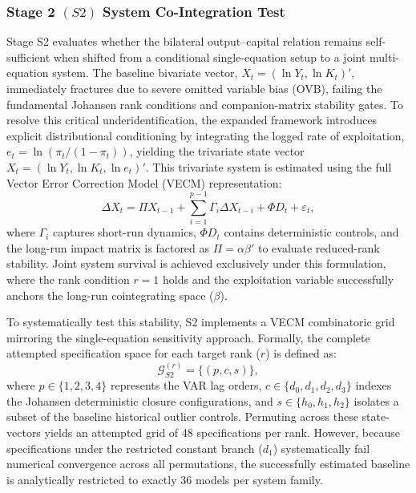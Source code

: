 \documentclass[11pt]{article}
\begin{document}
\subsubsection{Stage 2 \texorpdfstring{$(S2)$}: System Co-Integration Test}
\label{subsec:S2_system}

Stage S2 evaluates whether the bilateral output--capital relation remains self-sufficient when shifted from a conditional single-equation setup to a joint multi-equation system. The baseline bivariate vector, $X_t = (\ln Y_t, \ln K_t)'$, immediately fractures due to severe omitted variable bias (OVB), failing the fundamental Johansen rank conditions and companion-matrix stability gates. To resolve this critical underidentification, the expanded framework introduces explicit distributional conditioning by integrating the logged rate of exploitation, $e_t = \ln(\pi_t / (1 - \pi_t))$, yielding the trivariate state vector $X_t = (\ln Y_t, \ln K_t, \ln e_t)'$. This trivariate system is estimated using the full \citet{Johansen1991} Vector Error Correction Model (VECM) representation:
\begin{equation}
\label{eq:vecm_johansen}
\Delta X_t = \Pi X_{t-1} + \sum_{i=1}^{p-1} \Gamma_i \Delta X_{t-i} + \Phi D_t + \varepsilon_t,
\end{equation}
where $\Gamma_i$ captures short-run dynamics, $\Phi D_t$ contains deterministic controls, and the long-run impact matrix is factored as $\Pi = \alpha \beta'$ to evaluate reduced-rank stability. Joint system survival is achieved exclusively under this formulation, where the rank condition $r=1$ holds and the exploitation variable successfully anchors the long-run cointegrating space ($\beta$).

To systematically test this stability, S2 implements a VECM combinatoric grid mirroring the single-equation sensitivity approach. Formally, the complete attempted specification space for each target rank ($r$) is defined as:
\begin{equation}
\mathcal{G}_{S2}^{(r)} = \{(p, c, s)\},
\label{eq:G_S2}
\end{equation}
where $p \in \{1, 2, 3, 4\}$ represents the VAR lag orders, $c \in \{d_0, d_1, d_2, d_3\}$ indexes the Johansen deterministic closure configurations, and $s \in \{h_0, h_1, h_2\}$ isolates a subset of the baseline historical outlier controls. Permuting across these state-vectors yields an attempted grid of 48 specifications per rank. However, because specifications under the restricted constant branch ($d_1$) systematically fail numerical convergence across all permutations, the successfully estimated baseline is analytically restricted to exactly 36 models per system family.
\end{document}
